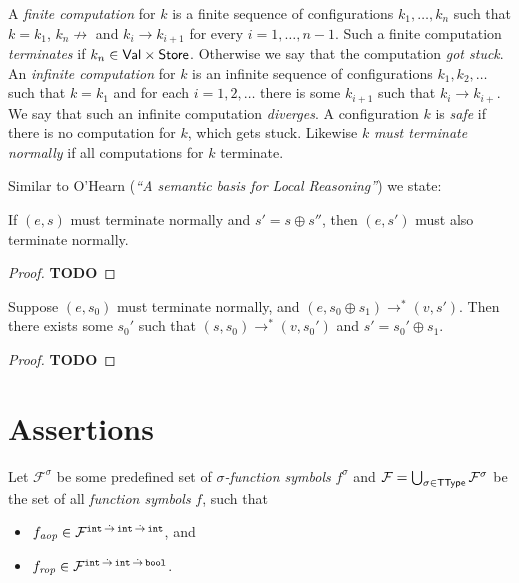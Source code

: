\documentclass[12pt,a4paper]{article}
\newcommand{\aop}{\nstyle{aop}}
\newcommand{\rop}{\nstyle{rop}}
\begin{document}
A {\em finite computation} for $k$ is a finite sequence of configurations $k_1,\ldots,k_n$
such that $k = k_1$, $k_n \not\to$ and $k_i \to k_{i+1}$ for every $i=1,\ldots,n-1$. Such a
finite computation {\em terminates} if $k_n \in \mathsf{Val}\times\mathsf{Store}$. Otherwise
we say that the computation {\em got stuck}.
An {\em infinite computation} for $k$ is an infinite sequence of configurations $k_1,k_2,\ldots$
such that $k=k_1$ and for each $i=1,2,\ldots$ there is some $k_{i+1}$ such that $k_i \to k_{i+}$.
We say that such an infinite computation {\em diverges}.
A configuration $k$ is {\em safe} if there is no computation for $k$, which gets
stuck. Likewise $k$ {\em must terminate normally} if all computations for $k$
terminate.

Similar to O'Hearn ({\em ``A semantic basis for Local Reasoning''}) we state:

\begin{lemma} \label{lemma:Termination_Monotonicity}
  If $(e,s)$ must terminate normally and $s' = s \oplus s''$, then $(e,s')$ must also terminate normally.
\end{lemma}

\begin{proof}
  {\bf TODO}
\end{proof}

\begin{lemma} \label{lemma:Frame_Property}
  Suppose $(e,s_0)$ must terminate normally, and $(e,s_0 \oplus s_1) \to^* (v,s')$. Then there exists some
  $s_0'$ such that $(s,s_0) \to^* (v,s_0')$ and $s' = s_0' \oplus s_1$.
\end{lemma}

\begin{proof}
  {\bf TODO}
\end{proof}


\section{Assertions}

Let $\mathcal{F}^\sigma$ be some predefined set of {\em $\sigma$-function symbols} $f^\sigma$ and
$\mathcal{F} = \bigcup_{\sigma\in\mathsf{TType}}\mathcal{F}^\sigma$ be the set of all {\em function symbols} $f$, such that
\begin{itemize}
\item $f_\aop \in \mathcal{F}^{\ttarrow{\tint}{\ttarrow{\tint}{\tint}}}$, and
\item $f_\rop \in \mathcal{F}^{\ttarrow{\tint}{\ttarrow{\tint}{\tbool}}}$.
\end{itemize}
\end{document}
